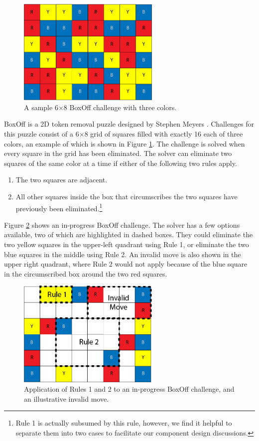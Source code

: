 \documentclass[journal]{IEEEtran}
\begin{document}
\begin{figure}[t]
\centering
\includegraphics[width=6.8cm]{figure1.png}
\caption{A sample 6$\times$8 BoxOff challenge with three colors.}
\label{fig:boxoffbig}
\end{figure}
\noindent
BoxOff is a 2D token removal puzzle designed by Stephen Meyers  \cite{BoxOffGAMES}. Challenges for this puzzle consist of a 6$\times$8 grid of squares filled with exactly 16 each of three colors, an example of which is shown in 
Figure \ref{fig:boxoffbig}. The challenge is solved when every square in the grid has been eliminated.  The solver can eliminate two squares of the same color at a time if either of the following two rules apply.
\begin{enumerate}
    \item The two squares are adjacent.
    \item All other squares inside the box that circumscribes the two squares have previously been eliminated.\footnote{Rule 1 is actually subsumed by this rule, however, we find it helpful to separate them into two cases to facilitate our component design discussions.}
\end{enumerate}

Figure \ref{fig:boxoffrules} shows an in-progress BoxOff challenge. The solver has a few options available, two of which are highlighted in dashed boxes. They could eliminate the two yellow squares in the upper-left quadrant using Rule 1, or eliminate the two blue squares in the middle using Rule 2. An invalid move is also shown in the upper right quadrant, where Rule 2 would not apply because of the blue square in the circumscribed box around the two red squares.

\begin{figure}[t]
\centering
\includegraphics[width=6.8cm]{figure2.png}
\caption{Application of Rules 1 and 2 to an in-progress BoxOff challenge, and an illustrative invalid move.}
\label{fig:boxoffrules}
\end{figure}
\end{document}
